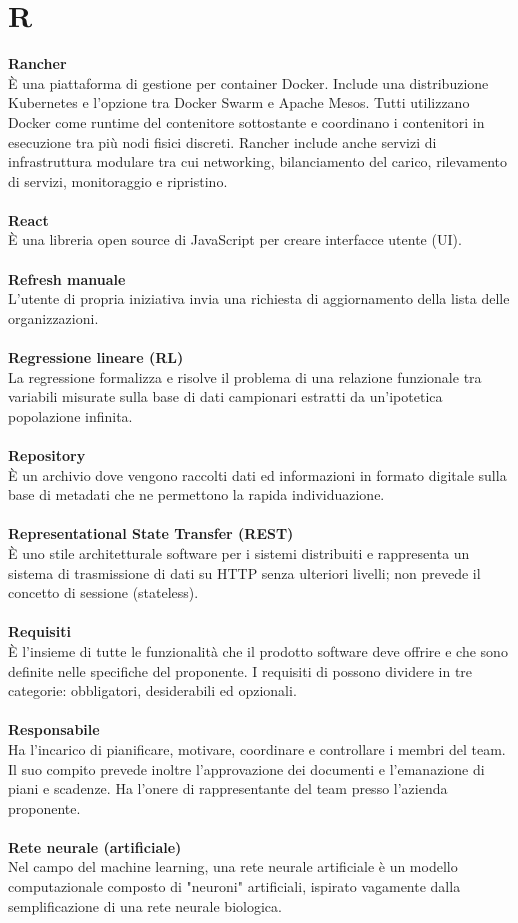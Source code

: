 \section{R}
\textbf{Rancher}\\
È una piattaforma di gestione per container Docker. Include una distribuzione Kubernetes e l'opzione tra Docker Swarm e Apache Mesos. Tutti utilizzano Docker come runtime del contenitore sottostante e coordinano i contenitori in esecuzione tra più nodi fisici discreti. Rancher include anche servizi di infrastruttura modulare tra cui networking, bilanciamento del carico, rilevamento di servizi, monitoraggio e ripristino. \\ \\
\textbf{React}\\
È una libreria open source di JavaScript per creare interfacce utente (UI). \\ \\
\textbf{Refresh manuale}\\
L'utente di propria iniziativa invia una richiesta di aggiornamento della lista delle organizzazioni. \\ \\
\textbf{Regressione lineare (RL)}\\
La regressione formalizza e risolve il problema di una relazione funzionale tra variabili misurate sulla base di dati campionari estratti da un'ipotetica popolazione infinita. \\ \\
\textbf{Repository}\\
È un archivio dove vengono raccolti dati ed informazioni in formato digitale sulla base di metadati che ne permettono la rapida individuazione. \\ \\
\textbf{Representational State Transfer (REST)}\\
È uno stile architetturale software per i sistemi distribuiti e rappresenta un sistema di trasmissione di dati su HTTP senza ulteriori livelli; non prevede il concetto di sessione (stateless). \\ \\
\textbf{Requisiti}\\
È l'insieme di tutte le funzionalità che il prodotto software deve offrire e che sono definite nelle specifiche del proponente. I requisiti di possono dividere in tre categorie: obbligatori, desiderabili ed opzionali.\\ \\
\textbf{Responsabile}\\
Ha l'incarico di pianificare, motivare, coordinare e controllare i membri del team. Il suo compito prevede inoltre l'approvazione dei documenti e l'emanazione di piani e scadenze. Ha l'onere di rappresentante del team presso l'azienda proponente. \\ \\
\textbf{Rete neurale (artificiale)}\\
Nel campo del machine learning, una rete neurale artificiale è un modello computazionale composto di "neuroni" artificiali, ispirato vagamente dalla semplificazione di una rete neurale biologica. \\ \\
\clearpage